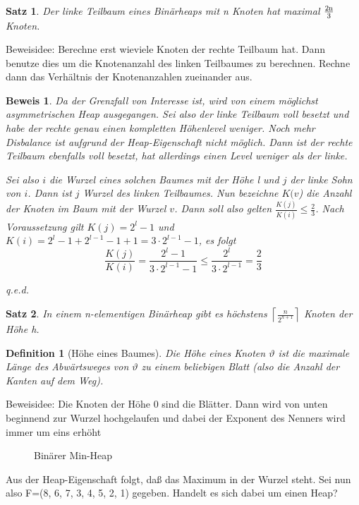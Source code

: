 \documentclass[ngerman,draft,parskip=half*,twoside]{scrreprt}
\theoremstyle{break}
\newtheorem{beweis}{Beweis}
\newtheorem{definition}{Definition}
\newtheorem{satz}{Satz}
\begin{document}
\begin{satz}
Der linke Teilbaum eines Binärheaps mit n Knoten hat maximal $\frac{2\textup{n}}{3}$ Knoten.
\end{satz}

Beweisidee: Berechne erst wieviele Knoten der rechte Teilbaum hat. Dann benutze dies um die Knotenanzahl des linken Teilbaumes zu
berechnen. Rechne dann das Verhältnis der Knotenanzahlen zueinander aus.
\begin{beweis}
Da der Grenzfall von Interesse ist, wird von einem möglichst asymmetrischen Heap ausgegangen. Sei also der linke Teilbaum voll besetzt
und habe der rechte genau einen kompletten Höhenlevel weniger. Noch mehr Disbalance ist aufgrund der Heap-Eigenschaft nicht möglich.
Dann ist der rechte Teilbaum ebenfalls voll besetzt, hat allerdings einen Level weniger als der linke.

Sei also $i$ die Wurzel eines solchen Baumes mit der Höhe l und $j$ der linke Sohn von $i$. Dann ist $j$ Wurzel des linken Teilbaumes. 
Nun bezeichne $K(v$) die Anzahl der Knoten im Baum mit der Wurzel $v$. Dann soll also gelten 
\(\frac{K(j)}{K(i)} \leq \frac{2}{3}\).
Nach Voraussetzung gilt $K(j)=2^l-1$ und $K(i)=2^l-1+2^{l-1}-1+1=3 \cdot 2^{l-1}-1$, es folgt
\[\frac{K(j)}{K(i)}= \frac{2^l-1}{3\cdot 2^{l-1}-1} \leq \frac{2^l}{3 \cdot 2^{l-1}}= \frac{2}{3}\]

\hfill q.e.d.
\end{beweis}

\begin{satz}
In einem n-elementigen Binärheap gibt es höchstens $\left\lceil \frac{n}{2^{h+1}}\right\rceil$ Knoten der Höhe h.
\end{satz}

\begin{definition}[Höhe eines Baumes]
Die Höhe eines Knoten $\vartheta$ ist die maximale Länge des Abwärtsweges von $\vartheta$ zu einem beliebigen Blatt (also die Anzahl
der Kanten auf dem Weg).
\end{definition}

Beweisidee:
Die Knoten der Höhe 0 sind die Blätter. Dann wird von unten beginnend zur Wurzel hochgelaufen und dabei der
Exponent des Nenners wird immer um eins erhöht
\begin{figure}[H]
	\centering
	\caption{Binärer Min-Heap}
	\label{101103b}
\end{figure}

Aus der Heap-Eigenschaft folgt, daß das Maximum in der Wurzel steht. Sei nun also F=(8, 6, 7, 3, 4, 5, 2, 1) gegeben. Handelt es sich
dabei um einen Heap?
\end{document}
